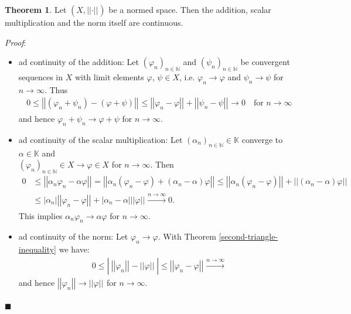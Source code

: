 \documentclass[12pt, a4paper]{article}
\numberwithin{equation}{section}
\theoremstyle{definition}
\theoremstyle{definition}
\newtheorem{theorem}[thm]{Theorem}
\newcommand{\norm}[2]{\left\vert\left\vert #1 \right\vert\right\vert_{#2}}
\newcommand{\abs}[1]{\left\vert #1 \right\vert}
\begin{document}
	\begin{theorem}\label{norms_continuities}
		Let $(X, \norm{\cdot}{})$ be a normed space. Then the addition, scalar multiplication and the norm itself are continuous. 
	\end{theorem}
	\noindent\textit{Proof}: 
	\begin{itemize}
		\item ad continuity of the addition: Let $(\varphi_n)_{n\in\mathbb{N}}$ and $(\psi_n)_{n\in\mathbb{N}}$ be convergent sequences in $X$ with limit elements $\varphi$, $\psi\in X$, i.e. $\varphi_n \longrightarrow \varphi$ and $\psi_n \longrightarrow \psi$ for $n\to\infty$. Thus 
		\begin{align}
			0\leq \norm{(\varphi_n + \psi_n) - (\varphi + \psi)}{} \leq \norm{\varphi_n - \varphi}{} + \norm{\psi_n - \psi}{} \longrightarrow 0 \quad\text{for } n\to \infty
		\end{align}
		and hence $\varphi_n + \psi_n \rightarrow \varphi + \psi$ for $n\to\infty$. 
		\item ad continuity of the scalar multiplication: Let $\left(\alpha_n\right)_{n\in\mathbb N} \in \mathbb K$ converge to $\alpha\in \mathbb K$ and \\ $\left(\varphi_n\right)_{n\in\mathbb N}\in X \rightarrow \varphi\in X$ for $n\to\infty$. Then 	
		\begin{align}
			0&\leq\norm{\alpha_n\varphi_n-\alpha\varphi}{} = \norm{\alpha_n\left(\varphi_n-\varphi\right) + \left(\alpha_n-\alpha\right)\varphi}{} \leq \norm{\alpha_n(\varphi_n-\varphi)}{} + \norm{\left(\alpha_n - \alpha\right)\varphi}{}
			\\ &\leq \abs{\alpha_n}\norm{\varphi_n-\varphi}{} + \abs{\alpha_n-\alpha}\norm{\varphi}{} \overset{n\to\infty}{\longrightarrow} 0. 
		\end{align}
		This implies $\alpha_n\varphi_n  \rightarrow \alpha\varphi$ for $n\to\infty$. 
		\item ad continuity of the norm: Let $\varphi_n \rightarrow\varphi$. With Theorem \ref{second-triangle-inequality} we have: 
		\begin{align}
			0\leq \abs{\ \norm{\varphi_n}{}-\norm{\varphi}{}\ } \leq \norm{\varphi_n - \varphi}{} \overset{n\to\infty}{\longrightarrow}  
		\end{align}
		and hence $\norm{\varphi_n}{} \rightarrow \norm{\varphi}{}$ for $n\to\infty$. 
	\end{itemize}
	\qquad\qquad\qquad\qquad\qquad\qquad\qquad\qquad\qquad\qquad\qquad\qquad\qquad\qquad\qquad\qquad\qquad\qquad\qquad\qquad\qquad\quad$\blacksquare$
\end{document}
